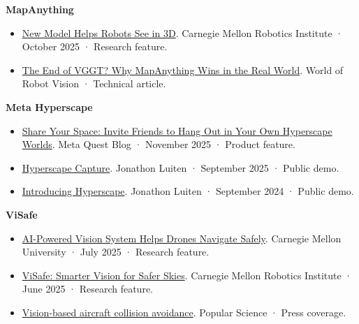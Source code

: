 
\begin{cventry}
\textbf{MapAnything}\par
\begin{itemize}[topsep=2pt]\small
  \item \href{https://www.ri.cmu.edu/new-model-helps-robots-see-in-3d/}{New Model Helps Robots See in 3D}. Carnegie Mellon Robotics Institute · October 2025 · Research feature.
  \item \href{https://worv.ghost.io/the-end-of-vggt-why-mapanything-wins-in-the-real-world/}{The End of VGGT? Why MapAnything Wins in the Real World}. World of Robot Vision · Technical article.
\end{itemize}
\end{cventry}

\begin{cventry}
\textbf{Meta Hyperscape}\par
\begin{itemize}[topsep=2pt]\small
  \item \href{https://www.meta.com/blog/hyperscape-worlds-sharing-hangout-friends-metaverse-digital-replicas/}{Share Your Space: Invite Friends to Hang Out in Your Own Hyperscape Worlds}. Meta Quest Blog · November 2025 · Product feature.
  \item \href{https://x.com/JonathonLuiten/status/1968474776793403734}{Hyperscape Capture}. Jonathon Luiten · September 2025 · Public demo.
  \item \href{https://x.com/JonathonLuiten/status/1838993539738255460}{Introducing Hyperscape}. Jonathon Luiten · September 2024 · Public demo.
\end{itemize}
\end{cventry}

\begin{cventry}
\textbf{ViSafe}\par
\begin{itemize}[topsep=2pt]\small
  \item \href{https://www.cmu.edu/news/stories/archives/2025/july/ai-powered-vision-system-helps-drones-navigate-safely}{AI-Powered Vision System Helps Drones Navigate Safely}. Carnegie Mellon University · July 2025 · Research feature.
  \item \href{https://www.ri.cmu.edu/visafe-smarter-vision-for-safer-skies/}{ViSafe: Smarter Vision for Safer Skies}. Carnegie Mellon Robotics Institute · June 2025 · Research feature.
  \item \href{https://www.popsci.com/technology/artificial-intelligence-fly-planes/}{Vision-based aircraft collision avoidance}. Popular Science · Press coverage.
\end{itemize}
\end{cventry}


